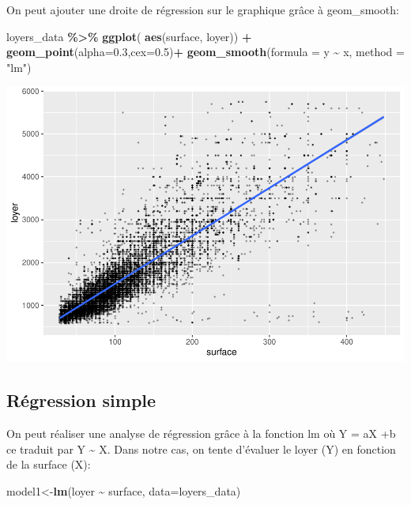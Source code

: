 \documentclass[
]{book}
\newenvironment{Shaded}{\begin{snugshade}}{\end{snugshade}}
\newcommand{\AttributeTok}[1]{\textcolor[rgb]{0.13,0.29,0.53}{#1}}
\newcommand{\FloatTok}[1]{\textcolor[rgb]{0.00,0.00,0.81}{#1}}
\newcommand{\FunctionTok}[1]{\textcolor[rgb]{0.13,0.29,0.53}{\textbf{#1}}}
\newcommand{\NormalTok}[1]{#1}
\newcommand{\OtherTok}[1]{\textcolor[rgb]{0.56,0.35,0.01}{#1}}
\newcommand{\SpecialCharTok}[1]{\textcolor[rgb]{0.81,0.36,0.00}{\textbf{#1}}}
\newcommand{\StringTok}[1]{\textcolor[rgb]{0.31,0.60,0.02}{#1}}
\begin{document}
On peut ajouter une droite de régression sur le graphique grâce à
geom\_smooth:

\begin{Shaded}
\begin{Highlighting}[]
\NormalTok{loyers\_data }\SpecialCharTok{\%\textgreater{}\%}
  \FunctionTok{ggplot}\NormalTok{( }\FunctionTok{aes}\NormalTok{(surface, loyer)) }\SpecialCharTok{+}
  \FunctionTok{geom\_point}\NormalTok{(}\AttributeTok{alpha=}\FloatTok{0.3}\NormalTok{,}\AttributeTok{cex=}\FloatTok{0.5}\NormalTok{)}\SpecialCharTok{+}
  \FunctionTok{geom\_smooth}\NormalTok{(}\AttributeTok{formula =}\NormalTok{ y }\SpecialCharTok{\textasciitilde{}}\NormalTok{ x, }\AttributeTok{method =} \StringTok{"lm"}\NormalTok{)}
\end{Highlighting}
\end{Shaded}

\includegraphics{bookdown-demo_files/figure-latex/unnamed-chunk-7-1.pdf}

\hypertarget{ruxe9gression-simple}{%
\subsection{Régression simple}\label{ruxe9gression-simple}}

On peut réaliser une analyse de régression grâce à la fonction lm où Y =
aX +b ce traduit par Y \textasciitilde{} X. Dans notre cas, on tente d'évaluer le loyer
(Y) en fonction de la surface (X):

\begin{Shaded}
\begin{Highlighting}[]
\NormalTok{model1}\OtherTok{\textless{}{-}}\FunctionTok{lm}\NormalTok{(loyer }\SpecialCharTok{\textasciitilde{}}\NormalTok{ surface, }\AttributeTok{data=}\NormalTok{loyers\_data)}
\end{Highlighting}
\end{Shaded}
\end{document}
